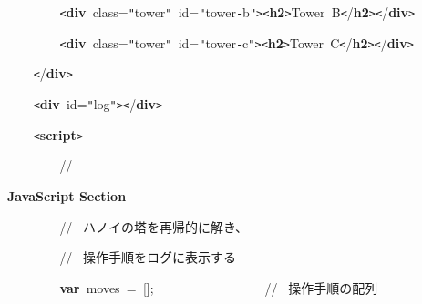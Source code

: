 \documentclass[a4paper,10pt]{article}
\def\mc{\relax}
\begin{document}
\noindent
\mbox{}{\tt\mc \ }{\tt\mc \ }{\tt\mc \ }{\tt\mc \ }{\tt\mc \ }{\tt\mc \ }{\tt\mc \ }{\tt\mc \ }{\tt <}\textbf{div}{\tt\mc \ }class={\tt "}tower{\tt "}{\tt\mc \ }id={\tt "}tower{\tt -}b{\tt "}{\tt >}{\tt <}\textbf{h2}{\tt >}Tower{\tt\mc \ }B{\tt <}/\textbf{h2}{\tt >}{\tt <}/\textbf{div}{\tt >}

\noindent
\mbox{}{\tt\mc \ }{\tt\mc \ }{\tt\mc \ }{\tt\mc \ }{\tt\mc \ }{\tt\mc \ }{\tt\mc \ }{\tt\mc \ }{\tt <}\textbf{div}{\tt\mc \ }class={\tt "}tower{\tt "}{\tt\mc \ }id={\tt "}tower{\tt -}c{\tt "}{\tt >}{\tt <}\textbf{h2}{\tt >}Tower{\tt\mc \ }C{\tt <}/\textbf{h2}{\tt >}{\tt <}/\textbf{div}{\tt >}

\noindent
\mbox{}{\tt\mc \ }{\tt\mc \ }{\tt\mc \ }{\tt\mc \ }{\tt <}/\textbf{div}{\tt >}

\noindent
\mbox{}\hfill

\noindent
\mbox{}{\tt\mc \ }{\tt\mc \ }{\tt\mc \ }{\tt\mc \ }{\tt <}\textbf{div}{\tt\mc \ }id={\tt "}log{\tt "}{\tt >}{\tt <}/\textbf{div}{\tt >}

\noindent
\mbox{}\hfill

\noindent
\mbox{}{\tt\mc \ }{\tt\mc \ }{\tt\mc \ }{\tt\mc \ }{\tt <}\textbf{script}{\tt >}

\noindent
\mbox{}{\tt\mc \ }{\tt\mc \ }{\tt\mc \ }{\tt\mc \ }{\tt\mc \ }{\tt\mc \ }{\tt\mc \ }{\tt\mc \ }\rm\mc // \ \centerline{\bf JavaScript Section}
\tt\mc 

\noindent
\mbox{}{\tt\mc \ }{\tt\mc \ }{\tt\mc \ }{\tt\mc \ }{\tt\mc \ }{\tt\mc \ }{\tt\mc \ }{\tt\mc \ }\rm\mc // \ ハノイの塔を再帰的に解き、
\tt\mc 

\noindent
\mbox{}{\tt\mc \ }{\tt\mc \ }{\tt\mc \ }{\tt\mc \ }{\tt\mc \ }{\tt\mc \ }{\tt\mc \ }{\tt\mc \ }\rm\mc // \    操作手順をログに表示する \hfill
\tt\mc 

\noindent
\mbox{}\hfill

\noindent
\mbox{}{\tt\mc \ }{\tt\mc \ }{\tt\mc \ }{\tt\mc \ }{\tt\mc \ }{\tt\mc \ }{\tt\mc \ }{\tt\mc \ }\textbf{var}{\tt\mc \ }moves{\tt\mc \ }={\tt\mc \ }[];{\tt\mc \ }{\tt\mc \ }{\tt\mc \ }{\tt\mc \ }{\tt\mc \ }{\tt\mc \ }{\tt\mc \ }{\tt\mc \ }{\tt\mc \ }{\tt\mc \ }{\tt\mc \ }{\tt\mc \ }{\tt\mc \ }{\tt\mc \ }{\tt\mc \ }{\tt\mc \ }{\tt\mc \ }\rm\mc // \ 操作手順の配列 \hfill
\tt\mc 

\noindent
\mbox{}\hfill

\noindent
\mbox{}{\tt\mc \ }{\tt\mc \ }{\tt\mc \ }{\tt\mc \ }{\tt\mc \ }{\tt\mc \ }{\tt\mc \ }{\tt\mc \ }\rm\mc {\tt /}{\tt *}\ 
\tt\mc 
\end{document}

